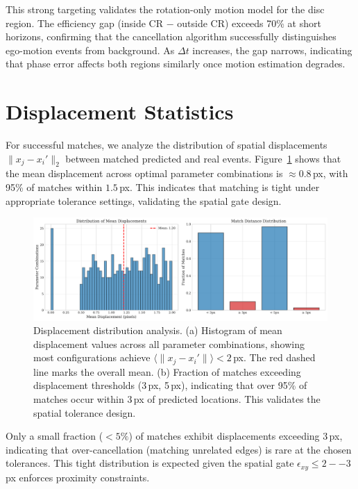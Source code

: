 This strong targeting validates the rotation-only motion model for the disc region. The efficiency gap (inside CR $-$ outside CR) exceeds 70\% at short horizons, confirming that the cancellation algorithm successfully distinguishes ego-motion events from background. As $\Delta t$ increases, the gap narrows, indicating that phase error affects both regions similarly once motion estimation degrades.

\section{Displacement Statistics}

For successful matches, we analyze the distribution of spatial displacements $\|x_j - x_i'\|_2$ between matched predicted and real events. Figure~\ref{fig:displacement} shows that the mean displacement across optimal parameter combinations is $\approx 0.8$\,px, with 95\% of matches within $1.5$\,px. This indicates that matching is tight under appropriate tolerance settings, validating the spatial gate design.

\begin{figure}[t]
  \centering
  \includegraphics[width=0.85\linewidth]{../code/thesis_figures/figure_displacement_distribution.pdf}
  \caption{Displacement distribution analysis. (a) Histogram of mean displacement values across all parameter combinations, showing most configurations achieve $\langle \|x_j - x_i'\| \rangle < 2$\,px. The red dashed line marks the overall mean. (b) Fraction of matches exceeding displacement thresholds (3\,px, 5\,px), indicating that over 95\% of matches occur within 3\,px of predicted locations. This validates the spatial tolerance design.}
  \label{fig:displacement}
\end{figure}

Only a small fraction ($< 5\%$) of matches exhibit displacements exceeding 3\,px, indicating that over-cancellation (matching unrelated edges) is rare at the chosen tolerances. This tight distribution is expected given the spatial gate $\epsilon_{xy} \leq 2--3$\,px enforces proximity constraints.

